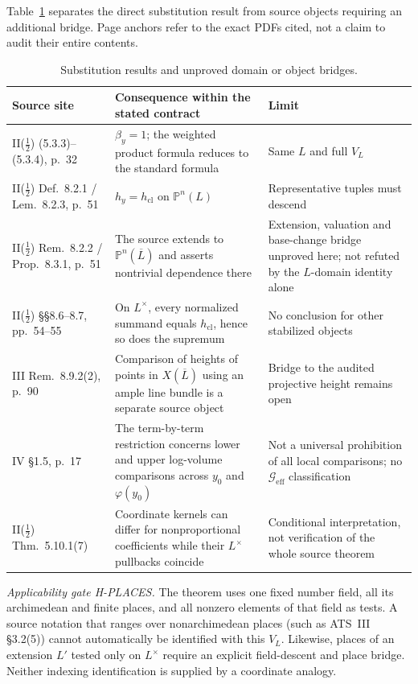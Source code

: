 \documentclass[11pt,a4paper]{article}
\theoremstyle{definition}
\theoremstyle{remark}
\newcommand{\Geff}{\mathcal{G}_{\mathrm{eff}}}
\begin{document}
Table~\ref{tab:substitution_audit} separates the direct substitution result
from source objects requiring an additional bridge. Page anchors refer to
the exact PDFs cited, not a claim to audit their entire contents.

\begin{table}[htbp]
\centering\small
\caption{Substitution results and unproved domain or object bridges.}\label{tab:substitution_audit}
\begin{tabularx}{\textwidth}{@{}p{}XX@{}}
\toprule
Source site & Consequence within the stated contract & Limit\\
\midrule
II($\tfrac12$) (5.3.3)--(5.3.4), p.~32 & $\beta_y=1$; the weighted product formula reduces to the standard formula & Same $L$ and full $V_L$\\
\addlinespace
II($\tfrac12$) Def.~8.2.1 / Lem.~8.2.3, p.~51 & $h_y=h_{\mathrm{cl}}$ on $\mathbb P^n(L)$ & Representative tuples must descend\\
\addlinespace
II($\tfrac12$) Rem.~8.2.2 / Prop.~8.3.1, p.~51 & The source extends to $\mathbb P^n(\overline L)$ and asserts nontrivial dependence there & Extension, valuation and base-change bridge unproved here; not refuted by the $L$-domain identity alone\\
\addlinespace
II($\tfrac12$) \S\S8.6--8.7, pp.~54--55 & On $L^\times$, every normalized summand equals $h_{\mathrm{cl}}$, hence so does the supremum & No conclusion for other stabilized objects\\
\addlinespace
III Rem.~8.9.2(2), p.~90 & Comparison of heights of points in $X(\overline L)$ using an ample line bundle is a separate source object & Bridge to the audited projective height remains open\\
\addlinespace
IV \S1.5, p.~17 & The term-by-term restriction concerns lower and upper log-volume comparisons across $y_0$ and $\varphi(y_0)$ & Not a universal prohibition of all local comparisons; no $\Geff$ classification\\
\addlinespace
II($\tfrac12$) Thm.~5.10.1(7) & Coordinate kernels can differ for nonproportional coefficients while their $L^\times$ pullbacks coincide & Conditional interpretation, not verification of the whole source theorem\\
\bottomrule
\end{tabularx}
\end{table}

\emph{Applicability gate H-PLACES.} The theorem uses one fixed number field,
all its archimedean and finite places, and all nonzero elements of that
field as tests. A source notation that ranges over nonarchimedean places
(such as ATS~III \S3.2(5)) cannot automatically be identified with this
$V_L$. Likewise, places of an extension $L'$ tested only on $L^\times$
require an explicit field-descent and place bridge. Neither indexing
identification is supplied by a coordinate analogy.
\end{document}
